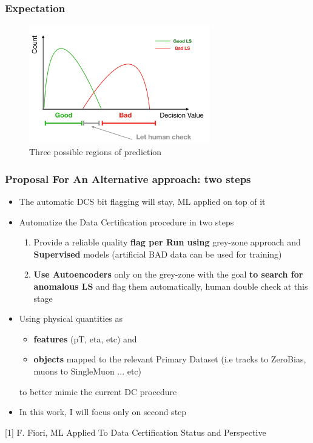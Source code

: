 \documentclass{beamer}
\begin{document}

\begin{frame}
\frametitle{Expectation}
\begin{figure}
    \includegraphics[height=0.7\textheight, width=0.7\textwidth]{images/expected_greyzone}
    \caption{Three possible regions of prediction}
\end{figure}
\end{frame}


\begin{frame}
\frametitle{Proposal For An Alternative approach: two steps}
\begin{itemize}
    \item The automatic DCS bit flagging will stay, ML applied on top of it
    \item Automatize the Data Certification procedure in two steps
    \begin{enumerate}
        \item Provide a reliable quality \textbf{flag per Run using} grey-zone approach and \textbf{Supervised} models (artificial BAD data can be used for training)
        \item \textbf{Use Autoencoders} only on the grey-zone with the goal \textbf{to search for anomalous LS} and flag them automatically, human double check at this stage
    \end{enumerate}
    \item Using physical quantities as
    \begin{itemize}
        \item \textbf{features} (pT, eta, etc) and
        \item \textbf{objects} mapped to the relevant Primary Dataset (i.e tracks to ZeroBias, muons to SingleMuon ... etc)
    \end{itemize}
    to better mimic the current DC procedure
    \item In this work, I will focus only on second step
\end{itemize}
\vspace{0.2in}
\tiny [1] F. Fiori, ML Applied To Data Certification Status and Perspective
\end{frame}
\end{document}
